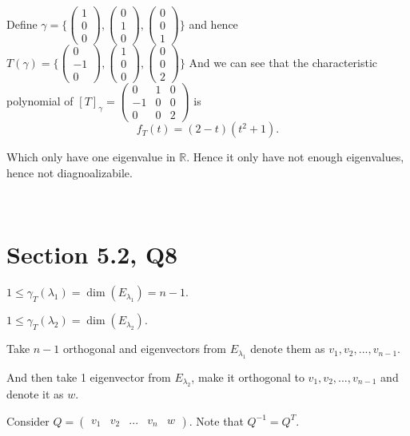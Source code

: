 \documentclass[12pt]{article}%
\begin{document}
Define $\gamma=\{ \begin{pmatrix}1\\0\\0\end{pmatrix} , \begin{pmatrix}0\\1\\0\end{pmatrix}, \begin{pmatrix}0\\0\\1\end{pmatrix} \}$ and hence $T(\gamma)=\{ \begin{pmatrix}0\\-1\\0\end{pmatrix}, \begin{pmatrix}1\\0\\0\end{pmatrix}, \begin{pmatrix}0\\0\\2\end{pmatrix} \}$
And we can see that the characteristic polynomial of $[T]_\gamma=\begin{pmatrix}0&1&0\\-1&0&0\\0&0&2\end{pmatrix}$ is $$f_{T}(t)=(2-t)(t^2+1).$$

Which only have one eigenvalue in $\mathbb{R}.$ Hence it only have not enough eigenvalues, hence not diagnoalizabile.




~\ 


\section{Section 5.2, Q8}

$1\leq \gamma_{T}(\lambda_1) = \dim{(E_{\lambda_1})}=n-1.$ 

$1\leq \gamma_{T}(\lambda_2) = \dim{(E_{\lambda_2})}.$

Take $n-1$ orthogonal and eigenvectors from $E_{\lambda_1}$ denote them as $v_1,v_2,...,v_{n-1}.$

And then take 1 eigenvector from $E_{\lambda_2}$, make it orthogonal to $v_1,v_2,...,v_{n-1}$ and denote it as $w.$

Consider $Q= \begin{pmatrix}v_1 & v_2 & ... & v_n & w\end{pmatrix}.$ Note that $Q^{-1}=Q^{T}.$ 
\end{document}
